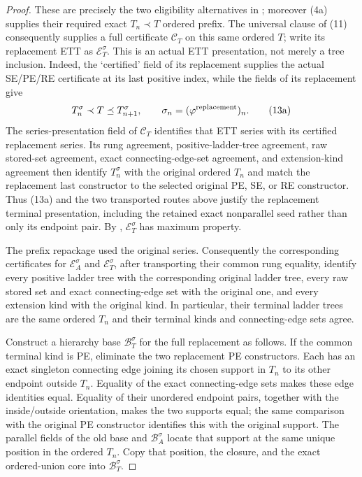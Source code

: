 \begin{proof}
These are precisely the two eligibility alternatives in
; moreover (4a) supplies their required exact
$T_n\prec T$ ordered prefix.  The universal clause of (11) consequently
supplies a full  certificate
$\mathcal C_T$ on this same ordered $T$; write its replacement ETT as
$\mathcal E_T^\sigma$.  This is an actual ETT presentation, not merely a
tree inclusion.  Indeed, the `certified' field of its replacement
 supplies the actual SE/PE/RE certificate at
its last positive index, while the fields of its replacement
 give
\[
 T_n^\sigma\prec T\preceq T_{n+1}^\sigma,
 \qquad \sigma_n=(\varphi^{\rm replacement})_n.              \tag{13a}
\]
The series-presentation field of $\mathcal C_T$ identifies that ETT
series with its certified replacement series.  Its rung agreement,
positive-ladder-tree agreement, raw stored-set agreement, exact
connecting-edge-set agreement, and extension-kind agreement then
identify $T_n^\sigma$ with the original ordered $T_n$ and match the
replacement last constructor to the selected original PE, SE, or RE
constructor.  Thus (13a) and the two transported routes above justify
the replacement terminal presentation, including the retained exact
nonparallel seed rather than only its endpoint pair.  By
, $\mathcal E_T^\sigma$ has maximum
property.

The prefix repackage used the original series.  Consequently the
corresponding certificates for $\mathcal E_A^\sigma$ and
$\mathcal E_T^\sigma$, after transporting their common rung equality,
identify every positive ladder tree with the corresponding original
ladder tree, every raw stored set and exact connecting-edge set with the
original one, and every extension kind with the original kind.  In
particular, their terminal ladder trees are the same ordered $T_n$ and
their terminal kinds and connecting-edge sets agree.

Construct a hierarchy base $\mathcal B_T^\sigma$ for the full
replacement as follows.  If the common terminal kind is PE, eliminate
the two replacement PE constructors.  Each
 has an exact singleton connecting edge
joining its chosen support in $T_n$ to its other endpoint outside
$T_n$.  Equality of the exact connecting-edge sets makes these edge
identities equal.  Equality of their unordered endpoint pairs, together
with the inside/outside orientation, makes the two supports equal; the
same comparison with the original PE constructor identifies this with
the original support.  The parallel fields of the old base and
$\mathcal B_A^\sigma$ locate that support at the same unique position in
the ordered  $T_n$.  Copy that position, the
closure, and the exact ordered-union core into
$\mathcal B_T^\sigma$.


\end{proof}
